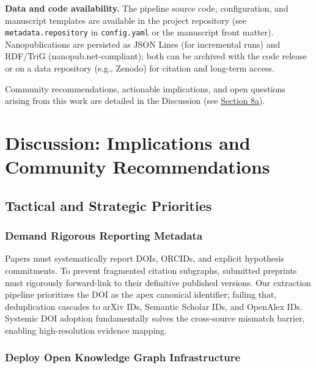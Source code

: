 \documentclass[
]{article}
\begin{document}
\textbf{Data and code availability.} The pipeline source code,
configuration, and manuscript templates are available in the project
repository (see \texttt{metadata.repository} in \texttt{config.yaml} or
the manuscript front matter). Nanopublications are persisted as JSON
Lines (for incremental runs) and RDF/TriG (nanopub.net-compliant); both
can be archived with the code release or on a data repository (e.g.,
Zenodo) for citation and long-term access.

Community recommendations, actionable implications, and open questions
arising from this work are detailed in the Discussion (see
\hyperref[sec:discussion]{Section 8a}).

\newpage

\section{\texorpdfstring{Discussion: Implications and Community
Recommendations
\label{sec:discussion}}{Discussion: Implications and Community Recommendations }}\label{discussion-implications-and-community-recommendations}

\subsection{Tactical and Strategic
Priorities}\label{tactical-and-strategic-priorities}

\subsubsection{Demand Rigorous Reporting
Metadata}\label{demand-rigorous-reporting-metadata}

Papers must systematically report DOIs, ORCIDs, and explicit hypothesis
commitments. To prevent fragmented citation subgraphs, submitted
preprints must rigorously forward-link to their definitive published
versions. Our extraction pipeline prioritizes the DOI as the apex
canonical identifier; failing that, deduplication cascades to arXiv IDs,
Semantic Scholar IDs, and OpenAlex IDs. Systemic DOI adoption
fundamentally solves the cross-source mismatch barrier, enabling
high-resolution evidence mapping.

\subsubsection{Deploy Open Knowledge Graph
Infrastructure}\label{deploy-open-knowledge-graph-infrastructure}
\end{document}
